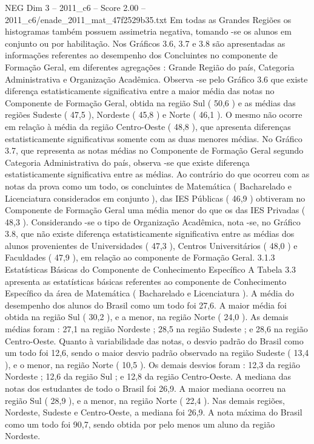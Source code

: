 \begin{textsample}{NEG Dim 3 – 2011\_c6 – Score 2.00 – 2011\_c6/enade\_2011\_mat\_47f2529b35.txt}
Em todas as Grandes Regiões os histogramas também possuem assimetria negativa, tomando -se os alunos em conjunto ou por habilitação.
Nos Gráficos 3.6, 3.7 e 3.8 são apresentadas as informações referentes ao desempenho dos Concluintes no componente de Formação Geral, em diferentes agregações : Grande Região do país, Categoria Administrativa e Organização Acadêmica.
Observa -se pelo Gráfico 3.6 que existe diferença estatisticamente significativa entre a maior média das notas no Componente de Formação Geral, obtida na região Sul ( 50,6 ) e as médias das regiões Sudeste ( 47,5 ), Nordeste ( 45,8 ) e Norte ( 46,1 ).
O mesmo não ocorre em relação à média da região Centro-Oeste ( 48,8 ), que apresenta diferenças estatisticamente significativas somente com as duas menores médias.
No Gráfico 3.7, que representa as notas médias no Componente de Formação Geral segundo Categoria Administrativa do país, observa -se que existe diferença estatisticamente significativa entre as médias.
Ao contrário do que ocorreu com as notas da prova como um todo, os concluintes de Matemática ( Bacharelado e Licenciatura considerados em conjunto ), das IES Públicas ( 46,9 ) obtiveram no Componente de Formação Geral uma média menor do que os das IES Privadas ( 48,3 ).
Considerando -se o tipo de Organização Acadêmica, nota -se, no Gráfico 3.8, que não existe diferença estatisticamente significativa entre as médias dos alunos provenientes de Universidades ( 47,3 ), Centros Universitários ( 48,0 ) e Faculdades ( 47,9 ), em relação ao componente de Formação Geral. 3.1.3 Estatísticas Básicas do Componente de Conhecimento Específico A Tabela 3.3 apresenta as estatísticas básicas referentes ao componente de Conhecimento Específico da área de Matemática ( Bacharelado e Licenciatura ).
A média do desempenho dos alunos do Brasil como um todo foi 27,6.
A maior média foi obtida na região Sul ( 30,2 ), e a menor, na região Norte ( 24,0 ).
As demais médias foram : 27,1 na região Nordeste ; 28,5 na região Sudeste ; e 28,6 na região Centro-Oeste.
Quanto à variabilidade das notas, o desvio padrão do Brasil como um todo foi 12,6, sendo o maior desvio padrão observado na região Sudeste ( 13,4 ), e o menor, na região Norte ( 10,5 ).
Os demais desvios foram : 12,3 da região Nordeste ; 12,6 da região Sul ; e 12,8 da região Centro-Oeste.
A mediana das notas dos estudantes de todo o Brasil foi 26,9.
A maior mediana ocorreu na região Sul ( 28,9 ), e a menor, na região Norte ( 22,4 ).
Nas demais regiões, Nordeste, Sudeste e Centro-Oeste, a mediana foi 26,9.
A nota máxima do Brasil como um todo foi 90,7, sendo obtida por pelo menos um aluno da região Nordeste.

\end{textsample}
